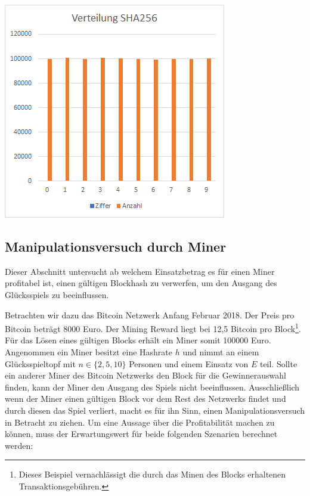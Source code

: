 \begin{minipage}{0.5\textwidth}
\includegraphics[width=\textwidth]{Figures/verteilung_sha256}
\centering
\decoRule
{}
\label{fig:verteilung_sha256}
\end{minipage}


\subsection{Manipulationsversuch durch Miner} \label{btc_eval_miner}
Dieser Abschnitt untersucht ab welchem Einsatzbetrag es für einen Miner profitabel ist, einen gültigen Blockhash zu verwerfen, um den Ausgang des Glücksspiels zu beeinflussen.

Betrachten wir dazu das Bitcoin Netzwerk Anfang Februar 2018. Der Preis pro Bitcoin beträgt 8000 Euro. Der Mining Reward liegt bei 12,5 Bitcoin pro Block\footnote{Dieses Beispiel vernachlässigt die durch das Minen des Blocks erhaltenen Transaktionsgebühren.}. Für das Lösen eines gültigen Blocks erhält ein Miner somit 100000 Euro.
Angenommen ein Miner besitzt eine Hashrate $h$ und nimmt an einem Glücksspieltopf mit $n\in\{2, 5, 10\}$ Personen und einem Einsatz von $E$ teil. 
Sollte ein anderer Miner des Bitcoin Netzwerks den Block für die Gewinnerauswahl finden, kann der Miner den Ausgang des Spiels nicht beeinflussen. Ausschließlich wenn der Miner einen gültigen Block vor dem Rest des Netzwerks findet und durch diesen das Spiel verliert, macht es für ihn Sinn, einen Manipulationsversuch in Betracht zu ziehen. Um eine Aussage über die Profitabilität machen zu können, muss der Erwartungswert für beide folgenden Szenarien berechnet werden:

